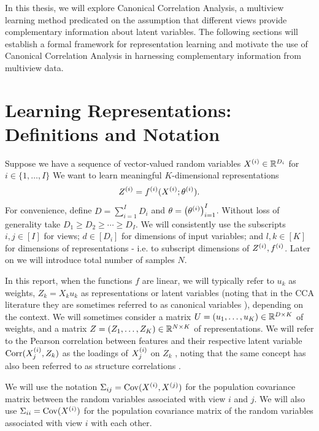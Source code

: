 In this thesis, we will explore Canonical Correlation Analysis, a multiview learning method predicated on the assumption that different \gls{views} provide complementary information about latent variables. The following sections will establish a formal framework for representation learning and motivate the use of Canonical Correlation Analysis in harnessing complementary information from multiview data.

\section{Learning Representations: Definitions and Notation}

Suppose we have a sequence of vector-valued random variables $X^{(i)} \in \mathbb{R}^{D_i}$ for $i \in \{1, \dots, I \}$
We want to learn meaningful $K$-dimensional representations
\begin{equation}
    \label{eq:general-form-of-representations}
    Z^{(i)} = f^{(i)}( X^{(i)}; \theta^{(i)}).
\end{equation}
For convenience, define $D = \sum_{i=1}^I D_i$ and $\theta = \left(\theta^{(i)}\right)_{i=1}^I$.
Without loss of generality take $D_1 \geq D_2 \geq \cdots \geq D_I$.
We will consistently use the subscripts $i,j \in [I]$ for \gls{views};
$d \in [D_i]$ for dimensions of input variables;
and $l,k \in [K]$ for dimensions of representations - i.e. to subscript dimensions of $Z^{(i)}, f^{(i)}$.
Later on we will introduce total number of samples $N$.

In this report, when the functions $f$ are linear, we will typically refer to $u_k$ as \gls{weights}, $Z_k = X_k u_k$ as \gls{representations} or \gls{latent variables} (noting that in the CCA literature they are sometimes referred to as canonical variables \citep{borga_learning_1998}), depending on the context.
We will sometimes consider a matrix $U = \left(u_1, \dots, u_K\right) \in \mathbb{R}^{D \times K}$ of \gls{weights}, and a matrix $Z = \left(Z_1, \dots, Z_K\right) \in \mathbb{R}^{N \times K}$ of representations.
We will refer to the Pearson correlation between features and their respective latent variable $\operatorname{Corr}(X^{(i)}_j, Z_k)$ as the \gls{loadings} of $X^{(i)}_j$ on $Z_k$ \citep{rosipal2005overview, alpert1972interpretation, borga_learning_1998}, noting that the same concept has also been referred to as structure correlations \citep{meredith1964canonical}.

We will use the notation $\Sigma_{ij}=\mathrm{Cov}(X^{(i)}, X^{(j)})$ for the population covariance matrix between the random variables associated with view $i$ and $j$. We will also use $\Sigma_{ii}= \mathrm{Cov}(X^{(i)})$ for the population covariance matrix of the random variables associated with view $i$ with each other.

